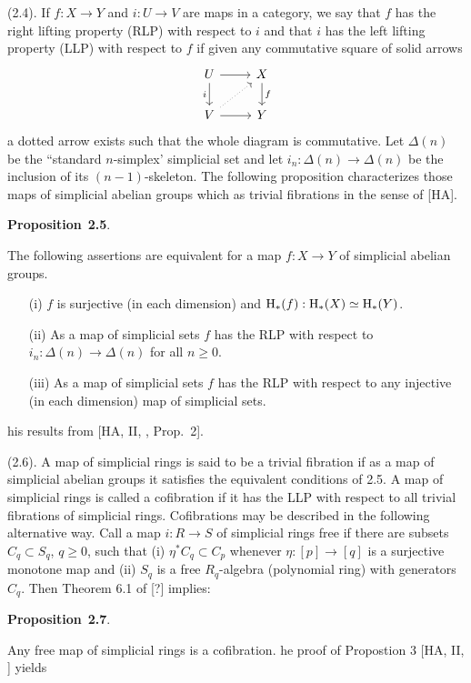 \documentclass[10pt,reqno]{amsart}
\newenvironment{prop}[1]{
\par\medskip\noindent\textbf{Proposition}~\textbf{#1}.\,\itshape
}
\renewcommand{\H}{\mathrm{H}}
\begin{document}
(2.4). If $f:X\to Y$ and $i:U\to V$ are maps in a category, we say that $f$ has the
right lifting property (RLP) with respect to $i$ and that $i$ has the left lifting
property (LLP) with respect to $f$ if given any commutative square of solid arrows
\[
  \begin{tikzcd}
    U\ar[r]\ar[d,"i"'] & X\ar[d,"f"]\\
    V\ar[r]\ar[ur,dotted] & Y
  \end{tikzcd}
\]
a dotted arrow exists such that the whole diagram is commutative. Let $\Delta(n)$ be the
``standard $n$-simplex' simplicial set and let $i_n:\Delta(n)\to\Delta(n)$ be the
inclusion of its $(n-1)$-skeleton. The following proposition characterizes those maps
of simplicial abelian groups which as trivial fibrations in the sense of [HA].

\begin{prop}{2.5}
The following assertions are equivalent for a map $f:X\to Y$ of simplicial abelian
groups.
\begin{itemize}
  \item[(i)] $f$ is surjective (in each dimension) and $\H_\ast(f):\H_\ast(X)\simeq\H_\ast(Y)$.
  \item[(ii)] As a map of simplicial sets $f$ has the RLP with respect to
        $i_n:\Delta(n)\to\Delta(n)$ for all $n\geq 0$.
  \item[(iii)] As a map of simplicial sets $f$ has the RLP with respect to any injective
        (in each dimension) map of simplicial sets.
\end{itemize}
\end{prop}
This results from [HA, II, , Prop.~2].

(2.6). A map of simplicial rings is said to be a trivial fibration if as a map of
simplicial abelian groups it satisfies the equivalent conditions of 2.5. A map of
simplicial rings is called a cofibration if it has the LLP with respect to all trivial
fibrations of simplicial rings. Cofibrations may be described in the following
alternative way. Call a map $i:R\to S$ of simplicial rings free if there are subsets
$C_q\subset S_q$, $q\geq 0$, such that (i) $\eta^\ast C_q\subset C_p$ whenever
$\eta:[p]\to[q]$ is a surjective monotone map and (ii) $S_q$ is a free $R_q$-algebra
(polynomial ring) with generators $C_q$. Then Theorem 6.1 of [?] implies:

\begin{prop}{2.7}
Any free map of simplicial rings is a cofibration.
\end{prop}
The proof of Propostion 3 [HA, II, ] yields
\end{document}
